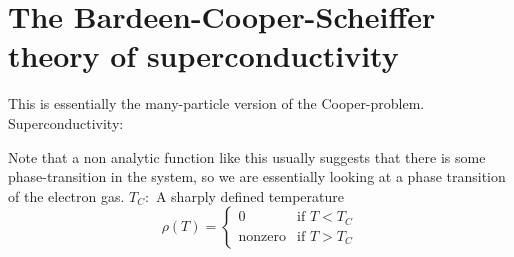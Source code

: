 \section[BCS-theory]{The Bardeen-Cooper-Scheiffer theory of superconductivity}

This is essentially the many-particle version of the Cooper-problem.
Superconductivity: 

Note that a non analytic function like this usually suggests that there is some phase-transition in the system, so we are essentially looking at a phase transition of the electron gas.
$T_C:$ A sharply defined temperature
\begin{equation}
\rho(T) =
\left\{
\begin{array}{ll}
	0  & \mbox{if } T<T_C \\
	\text{nonzero} & \mbox{if } T>T_C
\end{array}
\right.
\end{equation}


